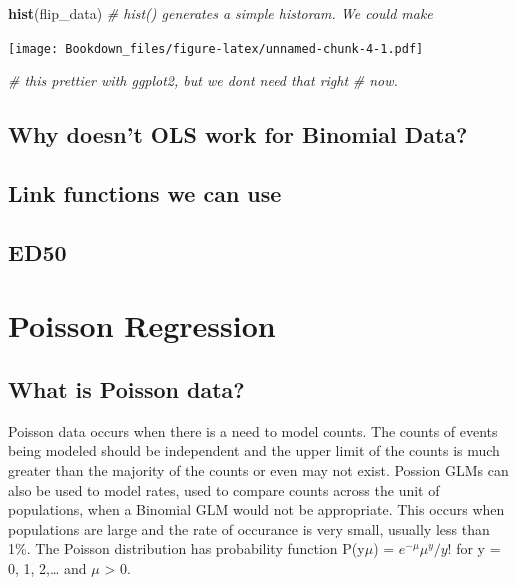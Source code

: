 \documentclass[
]{book}
\newenvironment{Shaded}{\begin{snugshade}}{\end{snugshade}}
\newcommand{\CommentTok}[1]{\textcolor[rgb]{0.56,0.35,0.01}{\textit{#1}}}
\newcommand{\KeywordTok}[1]{\textcolor[rgb]{0.13,0.29,0.53}{\textbf{#1}}}
\newcommand{\NormalTok}[1]{#1}
\begin{document}
\begin{Shaded}
\begin{Highlighting}[]
\KeywordTok{hist}\NormalTok{(flip\_data)         }\CommentTok{\# hist() generates a simple historam. We could make}
\end{Highlighting}
\end{Shaded}

\texttt{[image: Bookdown\_files/figure-latex/unnamed-chunk-4-1.pdf]}

\begin{Shaded}
\begin{Highlighting}[]
                        \CommentTok{\# this prettier with ggplot2, but we don\textquotesingle{}t need that right}
                        \CommentTok{\# now.}
\end{Highlighting}
\end{Shaded}

\hypertarget{why-doesnt-ols-work-for-binomial-data}{%
\section{Why doesn't OLS work for Binomial Data?}\label{why-doesnt-ols-work-for-binomial-data}}

\hypertarget{link-functions-we-can-use}{%
\section{Link functions we can use}\label{link-functions-we-can-use}}

\hypertarget{ed50}{%
\section{ED50}\label{ed50}}

\hypertarget{poisson-regression}{%
\chapter{Poisson Regression}\label{poisson-regression}}

\hypertarget{what-is-poisson-data}{%
\section{What is Poisson data?}\label{what-is-poisson-data}}

Poisson data occurs when there is a need to model counts. The counts of events being modeled should be independent and the upper limit of the counts is much greater than the majority of the counts or even may not exist. Possion GLMs can also be used to model rates, used to compare counts across the unit of populations, when a Binomial GLM would not be appropriate. This occurs when populations are large and the rate of occurance is very small, usually less than 1\%. The Poisson distribution has probability function P(y\textbar{}\(\mu\)) = \(e^{-\mu}\mu^y/y!\) for y = 0, 1, 2,\ldots{} and \(\mu\) \textgreater{} 0.
\end{document}
